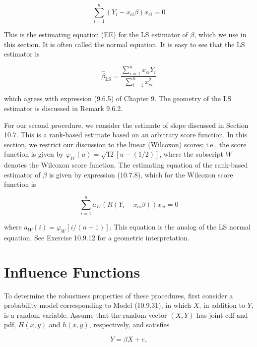 \begin{equation*}
\sum_{i=1}^{n}\left(Y_{i}-x_{c i} \beta\right) x_{c i}=0 \tag{10.9.32}
\end{equation*}


This is the estimating equation (EE) for the LS estimator of $\beta$, which we use in this section. It is often called the normal equation. It is easy to see that the LS\\
estimator is


\begin{equation*}
\widehat{\beta}_{\mathrm{LS}}=\frac{\sum_{i=1}^{n} x_{c i} Y_{i}}{\sum_{i=1}^{n} x_{c i}^{2}} \tag{10.9.33}
\end{equation*}


which agrees with expression (9.6.5) of Chapter 9. The geometry of the LS estimator is discussed in Remark 9.6.2.

For our second procedure, we consider the estimate of slope discussed in Section 10.7. This is a rank-based estimate based on an arbitrary score function. In this section, we restrict our discussion to the linear (Wilcoxon) scores; i.e., the score function is given by $\varphi_{W}(u)=\sqrt{12}[u-(1 / 2)]$, where the subscript $W$ denotes the Wilcoxon score function. The estimating equation of the rank-based estimator of $\beta$ is given by expression (10.7.8), which for the Wilcoxon score function is


\begin{equation*}
\sum_{i=1}^{n} a_{W}\left(R\left(Y_{i}-x_{c i} \beta\right)\right) x_{c i}=0 \tag{10.9.34}
\end{equation*}


where $a_{W}(i)=\varphi_{W}[i /(n+1)]$. This equation is the analog of the LS normal equation. See Exercise 10.9.12 for a geometric interpretation.

\section*{Influence Functions}
To determine the robustness properties of these procedures, first consider a probability model corresponding to Model (10.9.31), in which $X$, in addition to $Y$, is a random variable. Assume that the random vector $(X, Y)$ has joint cdf and pdf, $H(x, y)$ and $h(x, y)$, respectively, and satisfies


\begin{equation*}
Y=\beta X+e, \tag{10.9.35}
\end{equation*}


